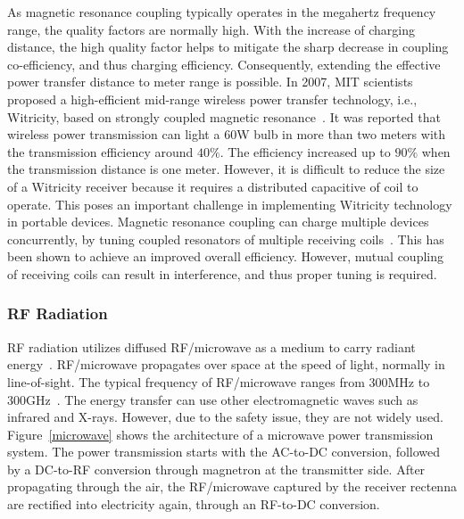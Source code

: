 \documentclass[twocolumn,10pt]{IEEEtran}
\begin{document}
As magnetic resonance coupling typically operates in the megahertz frequency range, the quality factors are normally high. With the increase of charging distance, the high quality factor helps to mitigate the sharp decrease in coupling co-efficiency, and thus charging efficiency. Consequently, extending the effective power transfer distance to meter range is possible. In 2007, MIT scientists proposed a high-efficient mid-range wireless power transfer technology, i.e., Witricity, based on strongly coupled magnetic resonance~\cite{Kurs2007A,witricity}. It was reported that wireless power transmission can light a 60W bulb in more than two meters with the transmission efficiency around $40\%$. The efficiency increased up to $90\%$ when the transmission distance is one meter. However, it is difficult to reduce the size of a Witricity receiver because it requires a distributed capacitive of coil to operate. This poses an important challenge in implementing Witricity technology in portable devices. Magnetic resonance coupling can charge multiple devices concurrently, by tuning coupled resonators of multiple receiving coils~\cite{A.2010Kurs}. This has been shown to achieve an improved overall efficiency. However, mutual coupling~\cite{G.2014Kim} of receiving coils can result in interference, and thus proper tuning is required.



\subsubsection{RF Radiation}

RF radiation utilizes diffused RF/microwave as a medium to carry radiant energy~\cite{2014X.Lu}. RF/microwave propagates over space at the speed of light, normally in line-of-sight. The typical frequency of RF/microwave ranges from 300MHz to 300GHz~\cite{X.LuIEEENetwork}. The energy transfer can use other electromagnetic waves such as infrared and X-rays. However, due to the safety issue, they are not widely used. Figure~\ref{microwave} shows the architecture of a microwave power transmission system. The power transmission starts with the AC-to-DC conversion, followed by a DC-to-RF conversion through magnetron at the transmitter side. After propagating through the air, the RF/microwave captured by the receiver rectenna are rectified into electricity again, through an RF-to-DC conversion.
\end{document}

